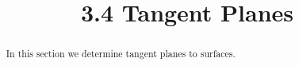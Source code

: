 \documentclass[handout]{ximera}
\title{3.4 Tangent Planes}
\begin{document}
\begin{abstract}
In this section we determine tangent planes to surfaces.
\end{abstract}

\maketitle
\end{document}
